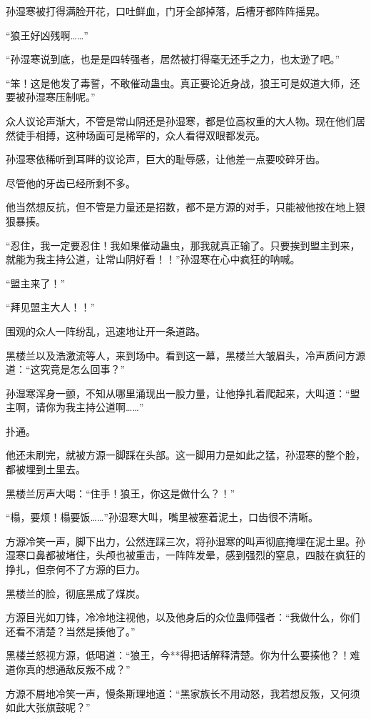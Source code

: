 \begin{this_body}
孙湿寒被打得满脸开花，口吐鲜血，门牙全部掉落，后槽牙都阵阵摇晃。

“狼王好凶残啊……”

“孙湿寒说到底，也是是四转强者，居然被打得毫无还手之力，也太逊了吧。”

“笨！这是他发了毒誓，不敢催动蛊虫。真正要论近身战，狼王可是奴道大师，还要被孙湿寒压制呢。”

众人议论声渐大，不管是常山阴还是孙湿寒，都是位高权重的大人物。现在他们居然徒手相搏，这种场面可是稀罕的，众人看得双眼都发亮。

孙湿寒依稀听到耳畔的议论声，巨大的耻辱感，让他差一点要咬碎牙齿。

尽管他的牙齿已经所剩不多。

他当然想反抗，但不管是力量还是招数，都不是方源的对手，只能被他按在地上狠狠暴揍。

“忍住，我一定要忍住！我如果催动蛊虫，那我就真正输了。只要挨到盟主到来，就能为我主持公道，让常山阴好看！！”孙湿寒在心中疯狂的呐喊。

“盟主来了！”

“拜见盟主大人！！”

围观的众人一阵纷乱，迅速地让开一条道路。

黑楼兰以及浩激流等人，来到场中。看到这一幕，黑楼兰大皱眉头，冷声质问方源道：“这究竟是怎么回事？”

孙湿寒浑身一颤，不知从哪里涌现出一股力量，让他挣扎着爬起来，大叫道：“盟主啊，请你为我主持公道啊……”

扑通。

他还未刷完，就被方源一脚踩在头部。这一脚用力是如此之猛，孙湿寒的整个脸，都被埋到土里去。

黑楼兰厉声大喝：“住手！狼王，你这是做什么？！”

“榻，要烦！榻要饭……”孙湿寒大叫，嘴里被塞着泥土，口齿很不清晰。

方源冷笑一声，脚下出力，公然连踩三次，将孙湿寒的叫声彻底掩埋在泥土里。孙湿寒口鼻都被堵住，头颅也被重击，一阵阵发晕，感到强烈的窒息，四肢在疯狂的挣扎，但奈何不了方源的巨力。

黑楼兰的脸，彻底黑成了煤炭。

方源目光如刀锋，冷冷地注视他，以及他身后的众位蛊师强者：“我做什么，你们还看不清楚？当然是揍他了。”

黑楼兰怒视方源，低喝道：“狼王，今**得把话解释清楚。你为什么要揍他？！难道你真的想通敌反叛不成？”

方源不屑地冷笑一声，慢条斯理地道：“黑家族长不用动怒，我若想反叛，又何须如此大张旗鼓呢？”


\end{this_body}
